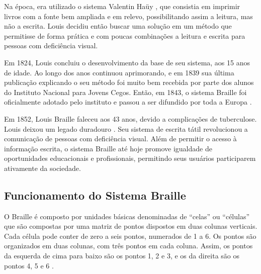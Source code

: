 Na época, era utilizado o sistema Valentin Haüy \parencite{REF03}, que consistia em imprimir livros com a fonte bem ampliada e em relevo, possibilitando assim a leitura, mas não a escrita. Louis decidiu então buscar uma solução em um método que permitisse de forma prática e com poucas combinações a leitura e escrita para pessoas com deficiência visual.

Em 1824, Louis concluiu o desenvolvimento da base de seu sistema, aos 15 anos de idade. Ao longo dos anos continuou aprimorando, e em 1839 sua última publicação explicando o seu método foi muito bem recebida por parte dos alunos do Instituto Nacional para Jovens Cegos. Então, em 1843, o sistema Braille foi oficialmente adotado pelo instituto e passou a ser difundido por toda a Europa \parencite{REF03}.

Em 1852, Louis Braille faleceu aos 43 anos, devido a complicações de tuberculose. Louis deixou um legado duradouro \parencite{REF03}. Seu sistema de escrita tátil revolucionou a comunicação de pessoas com deficiência visual. Além de permitir o acesso à informação escrita, o sistema Braille até hoje promove igualdade de oportunidades educacionais e profissionais, permitindo seus usuários participarem ativamente da sociedade.

\subsection{Funcionamento do Sistema Braille}

O Braille é composto por unidades básicas denominadas de “celas” ou “células” que são compostas por uma matriz de pontos dispostos em duas colunas verticais. Cada célula pode conter de zero a seis pontos, numerados de 1 a 6. Os pontos são organizados em duas colunas, com três pontos em cada coluna. Assim, os pontos da esquerda de cima para baixo são os pontos 1, 2 e 3, e os da direita são os pontos 4, 5 e 6 \parencite{REF04}.

